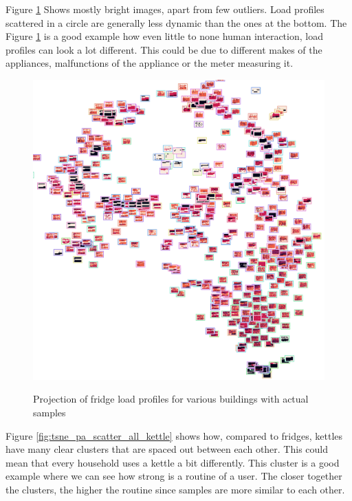Figure \ref{fig:tsne_pa_img_scatter_all_fridge} Shows mostly bright images, apart from few outliers.
Load profiles scattered in a circle are generally less dynamic than the ones at the bottom.
The Figure \ref{fig:tsne_pa_img_scatter_all_fridge} is a good example how even little to none human
interaction, load profiles can look a lot different. 
This could be due to different makes of the appliances, malfunctions of the appliance or the meter measuring it.

\begin{figure}[H]
	\centering
	\caption{Projection of fridge load profiles for various buildings with actual samples}
	\includegraphics[width=.9\textwidth]{Figures/TSNE/TSNE_per_appliance/all/img_scatter_allfridge_freeezer_fridge freezer.png}
	\label{fig:tsne_pa_img_scatter_all_fridge}
\end{figure}

Figure \ref{fig:tsne_pa_scatter_all_kettle} shows how,
compared to fridges, kettles have many clear clusters that are spaced out between each other. 
This could mean that every household uses a kettle a bit differently.
This cluster is a good example where we can see how strong is a routine of a user.
The closer together the clusters, the higher the routine since samples are more similar to each other.


